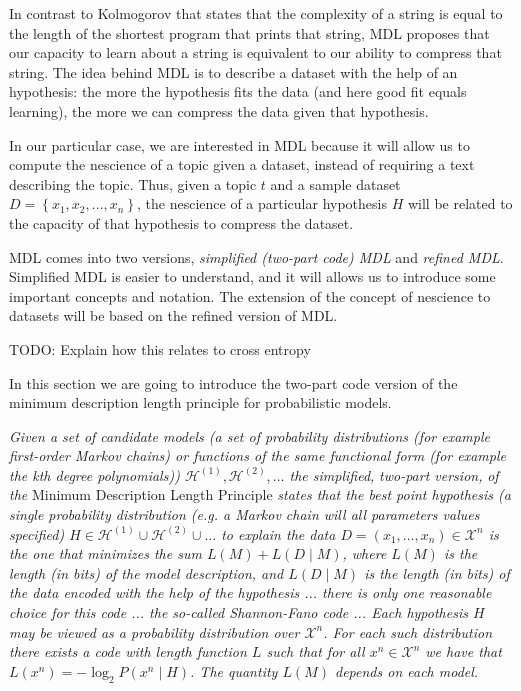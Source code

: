{In contrast to Kolmogorov that states that the complexity of a string
is equal to the length of the shortest program that prints that string,
MDL proposes that our capacity to learn about a string is equivalent
to our ability to compress that string. The idea behind MDL is to
describe a dataset with the help of an hypothesis: the more the hypothesis
fits the data (and here good fit equals learning), the more we can
compress the data given that hypothesis.

In our particular case, we are interested in MDL because it will allow
us to compute the nescience of a topic given a dataset, instead of
requiring a text describing the topic. Thus, given a topic $t$ and
a sample dataset $D=\left\{ x_{1},x_{2},\ldots,x_{n}\right\} $, the
nescience of a particular hypothesis $H$ will be related to the capacity
of that hypothesis to compress the dataset.

MDL comes into two versions, \emph{simplified (two-part code) MDL}
and \emph{refined MDL}. Simplified MDL is easier to understand, and
it will allows us to introduce some important concepts and notation.
The extension of the concept of nescience to datasets will be based
on the refined version of MDL.


    {\color{red} TODO: Explain how this relates to cross entropy}


In this section we are going to introduce the two-part code version
of the minimum description length principle for probabilistic models.

\emph{Given a set of candidate models (a set of probability distributions
    (for example first-order Markov chains) or functions of the same functional
    form (for example the kth degree polynomials)) $\mathcal{H^{\left(\text{1}\right)}},\mathcal{H}^{\left(2\right)},\ldots$
    the simplified,} \emph{two-part version,} \emph{of the} Minimum Description
Length Principle \cite{Gr=0000FC05}\emph{ states that the best point
    hypothesis (a single probability distribution (e.g. a Markov chain
    will all parameters values specified) $H\in\mathcal{H^{\left(\text{1}\right)}}\cup\mathcal{H}^{\left(2\right)}\cup\ldots$
    to explain the data $D=\left(x_{1},\ldots,x_{n}\right)\in\mathcal{X}^{n}$
    is the one that minimizes the sum $L(M)+L(D\mid M)$, where $L(M)$
    is the length (in bits) of the model description, and $L(D\mid M)$
    is the length (in bits) of the data encoded with the help of the hypothesis
    ... there is only one reasonable choice for this code ... the so-called
    Shannon-Fano code ... Each hypothesis $H$ may be viewed as a probability
    distribution over $\mathcal{X}^{n}$. For each such distribution there
    exists a code with length function $L$ such that for all $x^{n}\in\mathcal{X}^{n}$
    we have that $L\left(x^{n}\right)=-\log_{2}P\left(x^{n}\mid H\right)$.
    The quantity $L(M)$ depends on each model.}

}
